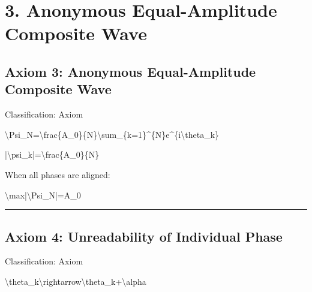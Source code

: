 \documentclass[
  a4paper]{article}
\newenvironment{Shaded}{}{}
\newcommand{\NormalTok}[1]{#1}
\begin{document}
\section{3. Anonymous Equal-Amplitude Composite
Wave}\label{anonymous-equal-amplitude-composite-wave}

\subsection{Axiom 3: Anonymous Equal-Amplitude Composite
Wave}\label{axiom-3-anonymous-equal-amplitude-composite-wave}

Classification: Axiom

\begin{Shaded}
\begin{Highlighting}[]
\NormalTok{\textbackslash{}Psi\_N=\textbackslash{}frac\{A\_0\}\{N\}\textbackslash{}sum\_\{k=1\}\^{}\{N\}e\^{}\{i\textbackslash{}theta\_k\}}
\end{Highlighting}
\end{Shaded}

\begin{Shaded}
\begin{Highlighting}[]
\NormalTok{|\textbackslash{}psi\_k|=\textbackslash{}frac\{A\_0\}\{N\}}
\end{Highlighting}
\end{Shaded}

When all phases are aligned:

\begin{Shaded}
\begin{Highlighting}[]
\NormalTok{\textbackslash{}max|\textbackslash{}Psi\_N|=A\_0}
\end{Highlighting}
\end{Shaded}

\begin{center}\rule{0.5\linewidth}{0.5pt}\end{center}

\subsection{Axiom 4: Unreadability of Individual
Phase}\label{axiom-4-unreadability-of-individual-phase}

Classification: Axiom

\begin{Shaded}
\begin{Highlighting}[]
\NormalTok{\textbackslash{}theta\_k\textbackslash{}rightarrow\textbackslash{}theta\_k+\textbackslash{}alpha}
\end{Highlighting}
\end{Shaded}
\end{document}
